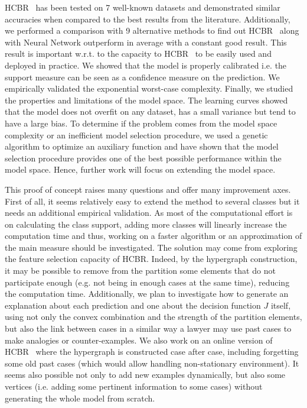 \documentclass[preprint,12pt]{elsarticle}
\def\HCBR{{\sc HCBR}}
\theoremstyle{definition}
\begin{document}
\HCBR~ has been tested on 7 well-known datasets and demonstrated similar accuracies when compared to the best results from the literature. Additionally, we performed a comparison with 9 alternative methods to find out \HCBR~ along with Neural Network outperform in average with a constant good result. This result is important w.r.t. to the capacity to \HCBR~ to be easily used and deployed in practice. We showed that the model is properly calibrated i.e. the support measure can be seen as a confidence measure on the prediction. 
We empirically validated the exponential worst-case complexity. Finally, we studied the properties and limitations of the model space. The learning curves showed that the model does not overfit on any dataset, has a small variance but tend to have a large bias. To determine if the problem comes from the model space complexity or an inefficient model selection procedure, we used a genetic algorithm to optimize an auxiliary function and have shown that the model selection procedure provides one of the best possible performance within the model space. Hence, further work will focus on extending the model space.

This proof of concept raises many questions and offer many improvement axes. First of all, it seems relatively easy to extend the method to several classes but it needs an additional empirical validation. As most of the computational effort is on calculating the class support, adding more classes will linearly increase the computation time and thus, working on a faster algorithm or an approximation of the main measure should be investigated. The solution may come from exploring the feature selection capacity of \HCBR. Indeed, by the hypergraph construction, it may be possible to remove from the partition some elements that do not participate enough (e.g. not being in enough cases at the same time), reducing the computation time.
Additionally, we plan to investigate how to generate an explanation about each prediction and one about the decision function $J$ itself, using not only the convex combination and the strength of the partition elements, but also the link between cases in a similar way a lawyer may use past cases to make analogies or counter-examples. We also work on an online version of \HCBR~ where the hypergraph is constructed case after case, including forgetting some old past cases (which would allow handling non-stationary environment). It seems also possible not only to add new examples dynamically, but also some vertices (i.e. adding some pertinent information to some cases) without generating the whole model from scratch. 
\end{document}
